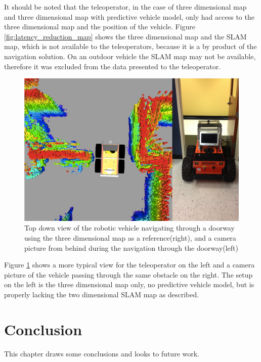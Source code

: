 \documentclass[12pt]{report}
\begin{document}
It should be noted that the teleoperator, in the case of three dimensional map and three dimensional map with predictive vehicle model, only had access to the three dimensional map and the position of the vehicle.  Figure \ref{fig:latency_reduction_map} shows the three dimensional map and the SLAM map, which is not available to the teleoperators, because it is a by product of the navigation solution.  On an outdoor vehicle the SLAM map may not be available, therefore it was excluded from the data presented to the teleoperator.

\begin{figure}[ht]
  \centering
  \includegraphics[width=6.5in,keepaspectratio]{3d_map_doorway.png}
  \caption{Top down view of the robotic vehicle navigating through a doorway using the three dimensional map as a reference(right), and a camera picture from behind during the navigation through the doorway(left)}
  \label{fig:3d_map_doorway}
\end{figure}

Figure \ref{fig:3d_map_doorway} shows a more typical view for the teleoperator on the left and a camera picture of the vehicle passing through the same obstacle on the right.  The setup on the left is the three dimensional map only, no predictive vehicle model, but is properly lacking the two dimensional SLAM map as described.


\chapter{Conclusion}\label{chap:conclusion}
This chapter draws some conclusions and looks to future work.
\end{document}
